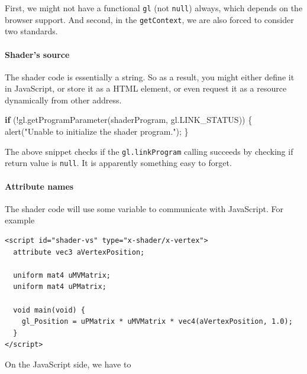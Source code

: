 \documentclass[]{article}
\newenvironment{Shaded}{}{}
\newcommand{\KeywordTok}[1]{\textcolor[rgb]{0.00,0.44,0.13}{\textbf{{#1}}}}
\newcommand{\StringTok}[1]{\textcolor[rgb]{0.25,0.44,0.63}{{#1}}}
\newcommand{\OtherTok}[1]{\textcolor[rgb]{0.00,0.44,0.13}{{#1}}}
\newcommand{\FunctionTok}[1]{\textcolor[rgb]{0.02,0.16,0.49}{{#1}}}
\newcommand{\NormalTok}[1]{{#1}}
\begin{document}
First, we might not have a functional \texttt{gl} (not \texttt{null})
always, which depends on the browser support. And second, in the
\texttt{getContext}, we are also forced to consider two standards.

\paragraph{Shader's source}\label{shaders-source}

The shader code is essentially a string. So as a result, you might
either define it in JavaScript, or store it as a HTML element, or even
request it as a resource dynamically from other address.

\begin{Shaded}
\begin{Highlighting}[]
\KeywordTok{if} \NormalTok{(!}\OtherTok{gl}\NormalTok{.}\FunctionTok{getProgramParameter}\NormalTok{(shaderProgram, }\OtherTok{gl}\NormalTok{.}\FunctionTok{LINK_STATUS}\NormalTok{)) \{}
  \FunctionTok{alert}\NormalTok{(}\StringTok{"Unable to initialize the shader program."}\NormalTok{);}
\NormalTok{\}}
\end{Highlighting}
\end{Shaded}

The above snippet checks if the \texttt{gl.linkProgram} calling succeeds
by checking if return value is \texttt{null}. It is apparently something
easy to forget.

\paragraph{Attribute names}\label{attribute-names}

The shader code will use some variable to communicate with JavaScript.
For example

\begin{verbatim}
<script id="shader-vs" type="x-shader/x-vertex">
  attribute vec3 aVertexPosition;

  uniform mat4 uMVMatrix;
  uniform mat4 uPMatrix;

  void main(void) {
    gl_Position = uPMatrix * uMVMatrix * vec4(aVertexPosition, 1.0);
  }
</script>
\end{verbatim}

On the JavaScript side, we have to
\end{document}
